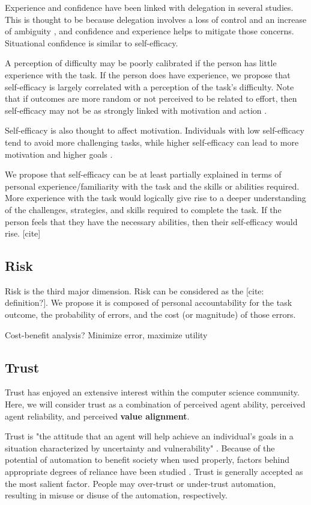 \documentclass[letterpaper]{article} %
\begin{document}
Experience and confidence have been linked with delegation in several studies. This is thought to be because delegation involves a loss of control and an increase of ambiguity \cite{milewski1}, and confidence and experience helps to mitigate those concerns. Situational confidence is similar to self-efficacy.

A perception of difficulty may be poorly calibrated if the person has little experience with the task. If the person does have experience, we propose that self-efficacy is largely correlated with a perception of the task's difficulty. Note that if outcomes are more random or not perceived to be related to effort, then self-efficacy may not be as strongly linked with motivation and action \cite{Bandura-agency}.

Self-efficacy is also thought to affect motivation.  Individuals with low self-efficacy tend to avoid more challenging tasks, while higher self-efficacy can lead to more motivation and higher goals \cite{Bandura-89}.

We propose that self-efficacy can be at least partially explained in terms of personal experience/familiarity with the task and the skills or abilities required. More experience with the task would logically give rise to a deeper understanding of the challenges, strategies, and skills required to complete the task. If the person feels that they have the necessary abilities, then their self-efficacy would rise. [cite]

\subsection{Risk}
Risk is the third major dimension. Risk can be considered as the [cite: definition?]. We propose it is composed of personal accountability for the task outcome, the probability of errors, and the cost (or magnitude) of those errors. 

Cost-benefit analysis? Minimize error, maximize utility

\subsection{Trust}
Trust has enjoyed an extensive interest within the computer science community. Here, we will consider trust as a combination of perceived agent ability, perceived agent reliability, and perceived \textbf{value alignment}.

Trust is "the attitude that an agent will help achieve an individual's goals in a situation characterized by uncertainty and vulnerability" \cite{lee}. Because of the potential of automation to benefit society when used properly, factors behind appropriate degrees of reliance have been studied \cite{lee}. Trust is generally accepted as the most salient factor. People may over-trust or under-trust automation, resulting in misuse or disuse of the automation, respectively. 
\end{document}

